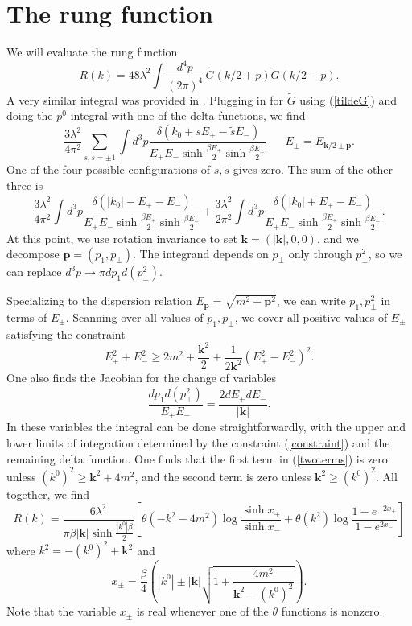 \documentclass[12pt]{article}
\newcommand{\be}{\begin{equation}}
\newcommand{\ee}{\end{equation}}
\renewcommand{\k}{\mathbf{k}}
\newcommand{\p}{\mathbf{p}}
\begin{document}
\section{The rung function}\label{rungapp}
We will evaluate the rung function
\be
R(k) = 48\lambda^2\int \frac{d^4p}{(2\pi)^4}\,\tilde{G}(k/2+p)\tilde{G}( k/2-p).
\ee
A very similar integral was provided in \cite{jeon}. Plugging in for $\tilde{G}$ using (\ref{tildeG}) and doing the $p^0$ integral with one of the delta functions, we find
\be
\frac{3\lambda^2}{4\pi^2}\sum_{s,\tilde{s} = \pm 1}\int d^3 p \frac{\,\delta(k_0 +sE_+-\tilde{s}E_-)}{E_+E_-\sinh \frac{\beta E_+}{2}\sinh \frac{\beta E_-}{2}} \hspace{20pt} E_{\pm} = E_{\k/2 \pm \p}.
\ee
One of the four possible configurations of $s,\tilde{s}$ gives zero. The sum of the other three is 
\be\label{twoterms}
\frac{3\lambda^2}{4\pi^2}\int d^3 p \frac{\delta(|k_0| -E_+-E_-)}{E_+E_-\sinh \frac{\beta E_+}{2}\sinh \frac{\beta E_-}{2}} + \frac{3\lambda^2}{2\pi^2} \int d^3 p \frac{\delta(|k_0| +E_+-E_-)}{E_+E_-\sinh \frac{\beta E_+}{2}\sinh \frac{\beta E_-}{2}} .
\ee
At this point, we use rotation invariance to set $\k = (|\k|,0,0)$, and we decompose $\p = (p_1,p_\perp)$. The integrand depends on $p_\perp$ only through $p_\perp^2$, so we can replace $d^3p \rightarrow \pi dp_1 d(p_\perp^2)$. 

Specializing to the dispersion relation  $E_\p = \sqrt{m^2+ \p^2}$, we can write $p_1,p_\perp^2$ in terms of $E_\pm$. Scanning over all values of $p_1,p_\perp$, we cover all positive values of $E_\pm$ satisfying the constraint
\be\label{constraint}
E_+^2+E_-^2 \ge 2m^2 + \frac{\k^2}{2} + \frac{1}{2\k^2}(E_+^2-E_-^2)^2.
\ee
One also finds the Jacobian for the change of variables
\be
\frac{dp_1 d(p_\perp^2)}{E_+E_-} = \frac{2dE_+dE_-}{|\k|}.
\ee
In these variables the integral can be done straightforwardly, with the upper and lower limits of integration determined by the constraint (\ref{constraint}) and the remaining delta function. One finds that the first term in (\ref{twoterms}) is zero unless $(k^0)^2 \ge \k^2 + 4m^2$, and the second term is zero unless $\k^2\ge (k^0)^2$. All together, we find
\be\label{runganswer}
R(k) = \frac{6\lambda^2}{\pi\beta |\k|\sinh \frac{|k^0|\beta}{2}}\left[\theta(-k^2-4m^2)\log\frac{\sinh x_+}{\sinh x_-} + \theta(k^2)\log\frac{1 - e^{-2x_+}}{1 - e^{2x_-}}\right]
\ee
where $k^2 = -(k^0)^2 + \k^2$ and
\be
x_\pm = \frac{\beta}{4}\left(|k^0|\pm |\k|\sqrt{1 + \frac{4m^2}{\k^2-(k^0)^2}}\right).
\ee
Note that the variable $x_\pm$ is real whenever one of the $\theta$ functions is nonzero. 
\end{document}
